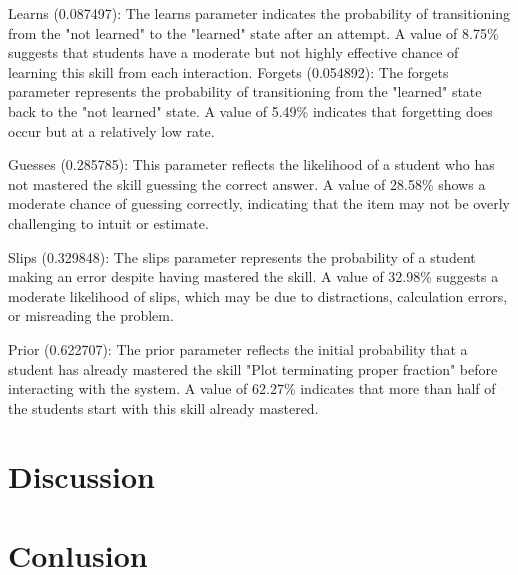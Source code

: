 \documentclass{article}
\begin{document}
Learns (0.087497): The learns parameter indicates the probability of transitioning from the "not learned" to the "learned" state after an attempt. A value of 8.75\% suggests that students have a moderate but not highly effective chance of learning this skill from each interaction.
Forgets (0.054892): The forgets parameter represents the probability of transitioning from the "learned" state back to the "not learned" state. A value of 5.49\% indicates that forgetting does occur but at a relatively low rate.

Guesses (0.285785): This parameter reflects the likelihood of a student who has not mastered the skill guessing the correct answer. A value of 28.58\% shows a moderate chance of guessing correctly, indicating that the item may not be overly challenging to intuit or estimate.

Slips (0.329848): The slips parameter represents the probability of a student making an error despite having mastered the skill. A value of 32.98\% suggests a moderate likelihood of slips, which may be due to distractions, calculation errors, or misreading the problem.

Prior (0.622707): The prior parameter reflects the initial probability that a student has already mastered the skill "Plot terminating proper fraction" before interacting with the system. A value of 62.27\% indicates that more than half of the students start with this skill already mastered.

\section{Discussion}
\section{Conlusion}

\printbibliography
\end{document}
